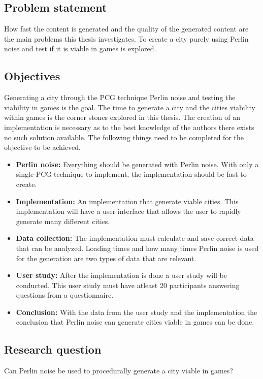 	\subsection{Problem statement}
	How fast the content is generated and the quality of the generated content are the main problems this thesis investigates.
	To create a city purely using Perlin noise and test if it is viable in games is explored.
	
	\subsection{Objectives}
	Generating a city through the PCG technique Perlin noise and testing the viability in games is the goal. The time to generate a city and the cities viability within games is the corner stones explored in this thesis. The creation of an implementation is necessary as to the best knowledge of the authors there exists no such solution available.
	The following things need to be completed for the objective to be achieved.
	
	\begin{itemize}
		\item \textbf{Perlin noise:} Everything should be generated with Perlin noise.
		With only a single PCG technique to implement, the implementation should be fast to create.
		
		\item \textbf{Implementation:} An implementation that generate viable cities. This implementation will have a user interface that allows the user to rapidly generate many different cities.
		
		\item \textbf{Data collection:} The implementation must calculate and save correct data that can be analyzed. Loading times and how many times Perlin noise is used for the generation are two types of data that are relevant.
		
		\item \textbf{User study:} After the implementation is done a user study will be conducted. This user study must have atleast 20 participants answering questions from a questionnaire.
		
		\item \textbf{Conclusion: } With the data from the user study and the implementation the conclusion that Perlin noise can generate cities viable in games can be done.
	\end{itemize} 
	
	\subsection{Research question}
	Can Perlin noise be used to procedurally generate a city viable in games?
